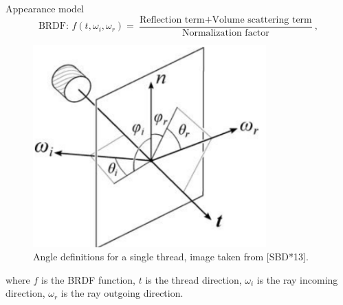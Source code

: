 \documentclass{beamer}
\begin{document}
\begin{frame}{Appearance model}
\begin{equation*} 
\mbox{BRDF: } f(t, \omega_i, \omega_r) =  \frac{\mbox{Reflection term} + \mbox{Volume scattering term}}{\mbox{Normalization factor}},
\end{equation*}

\begin{multicols}{2}

\begin{figure}[!htb]
    \centering
    \begin{minipage}{.5\textwidth}
        \centering
        \includegraphics[width=0.8\textwidth]{img/cloth_directions}
        \caption*{\tiny{Angle definitions for a single thread, image taken from [SBD*13].}}
    \end{minipage}%
\end{figure}

\vfill
\columnbreak
\vspace*{0.2cm}
\footnotesize{ where $f$ is the BRDF function, $t$ is the thread direction, $\omega_i$ is the ray incoming direction, $\omega_r$ is the ray outgoing direction. }
\end{multicols}

\end{frame}
\end{document}
